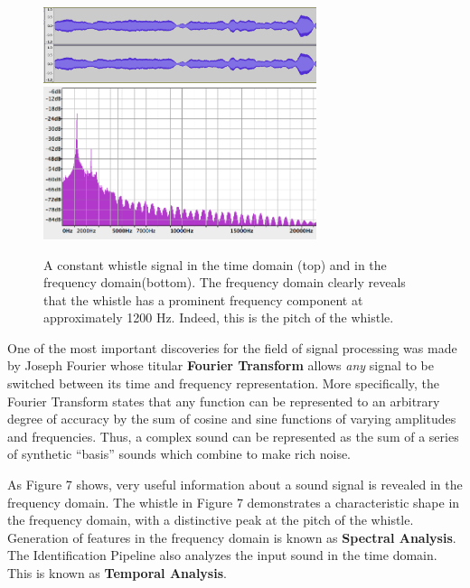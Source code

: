 \documentclass[DIV=calc, paper=a4, fontsize=11pt, twocolumn]{scrartcl}   %
\begin{document}
\begin{figure}[h]
\centering
\includegraphics[width=80mm]{figures/whistletimedomain.png}
\includegraphics[width=80mm]{figures/frequencydomainwhistle.png}
\caption{A constant whistle signal in the time domain (top) and in the frequency domain(bottom). The frequency domain clearly reveals that the whistle has a prominent frequency component at approximately 1200 Hz. Indeed, this is the pitch of the whistle. }
\label{overflow}
\end{figure}

   One of the most important discoveries for the field of signal processing was made by Joseph Fourier whose titular \textbf{Fourier Transform} allows \textit{any} signal to be switched between its time and frequency representation. More specifically, the Fourier Transform states that any function can be represented to an arbitrary degree of accuracy by the sum of cosine and sine functions of varying amplitudes and frequencies. Thus, a complex sound can be represented as the sum of a series of synthetic ``basis'' sounds which combine to make rich noise.

  \par As Figure 7 shows, very useful information about a sound signal is revealed in the frequency domain. The whistle in Figure 7 demonstrates a characteristic shape in the frequency domain, with a distinctive peak at the pitch of the whistle. Generation of features in the frequency domain is known as \textbf{Spectral Analysis}. The Identification Pipeline also analyzes the input sound in the time domain. This is known as \textbf{Temporal Analysis}.
\end{document}
